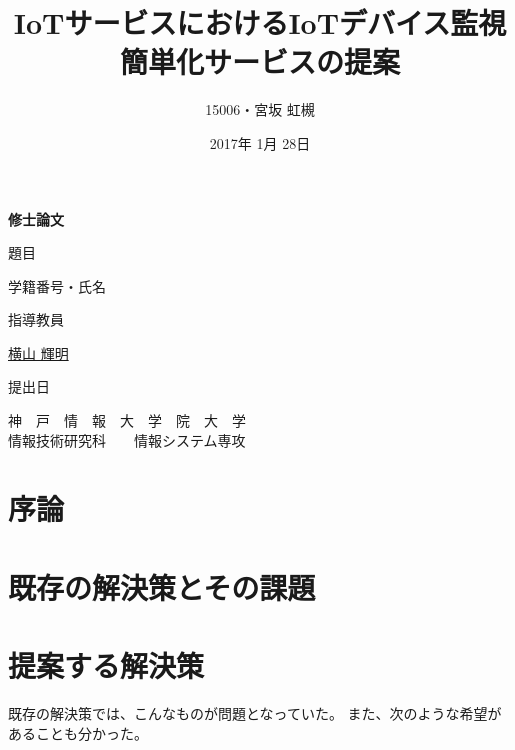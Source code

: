 \documentclass[a4paper]{jreport}
\begin{document}
\makeatletter

\title{IoTサービスにおけるIoTデバイス監視簡単化サービスの提案}
\author{15006・宮坂 虹槻}
\date{2017年 1月 28日}
\def\@teacher{横山 輝明}


\begin{titlepage}\begin{center}
\thispagestyle{plain}
{\Huge \textbf{修士論文} \par}
\vspace{1.5cm}
{\LARGE\gt 題目 \par}
{\LARGE\gt \underline{\@title} \par}
\vspace{2.5cm}
{\LARGE\gt 学籍番号・氏名 \par}
\vspace{1.5cm}
{\LARGE \underline{\@author} \par}
\vspace{1.5cm}
{\LARGE\gt 指導教員 \par}
\vspace{1.5cm}
{\LARGE\gt \underline{\@teacher} \par}
\vspace{1.5cm}
{\LARGE\gt 提出日 \par}
\vspace{1.5cm}
{\LARGE\gt \underline{\@date} \par}
\vspace{1.5cm}
{\Large\gt
神　戸　情　報　大　学　院　大　学\\
情報技術研究科　　情報システム専攻\\
\par}
\end{center}\end{titlepage}
\restoregeometry
\makeatother

\tableofcontents

\begin{abstract}

\end{abstract}

\chapter{序論}


\chapter{既存の解決策とその課題}

\chapter{提案する解決策}
既存の解決策では、こんなものが問題となっていた。
また、次のような希望があることも分かった。
\end{document}
